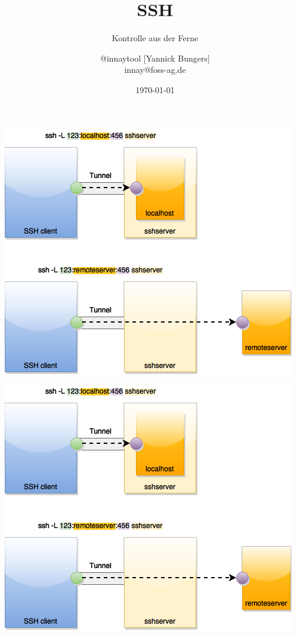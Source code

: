 \documentclass[handout]{beamer}
\title{SSH}
\subtitle{Kontrolle aus der Ferne}
\author{@innaytool [Yannick Bungers] \\ innay@foss-ag.de}
\institute{FOSS AG}
\date{\today}
\begin{document}
\begin{frame}
\titlepage
\end{frame}

%



%

%




%




\begin{frame}
	\includegraphics[scale=0.55]{ssh-L-tunnel.png}
\end{frame}



\begin{frame}
\includegraphics[scale=0.55]{ssh-L-tunnel.png}
\end{frame}




\end{document}
